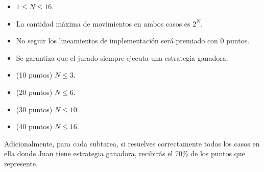 \documentclass[12pt]{scrartcl}
\begin{document}

        \begin{itemize}
            \item $1 \le N \le 16$.
            \item La cantidad máxima de movimientos en ambos casos es $2^N$.
            \item No seguir los lineamientos de implementación será premiado con 0 puntos.
            \item Se garantiza que el jurado siempre ejecuta una estrategia ganadora.
        \end{itemize}


    
        \begin{itemize}
            \item (10 puntos) $N \le 3$.
            \item (20 puntos) $N \le 6$.
            \item (30 puntos) $N \le 10$.
            \item (40 puntos) $N \le 16$.
        \end{itemize}

        Adicionalmente, para cada subtarea, si resuelves correctamente todos los casos en ella donde Juan tiene estrategia ganadora, recibirás el 70\% de los puntos que represente.
    
        

    
    
\end{document}
